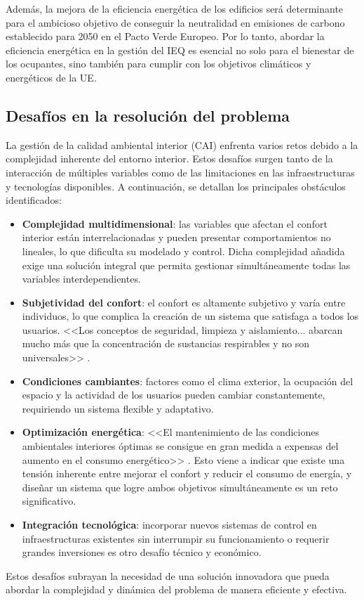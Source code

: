 Además, la mejora de la eficiencia energética de los edificios será determinante para el ambicioso objetivo de conseguir la neutralidad en emisiones de carbono establecido para 2050 en el Pacto Verde Europeo. Por lo tanto, abordar la eficiencia energética en la gestión del IEQ es esencial no solo para el bienestar de los ocupantes, sino también para cumplir con los objetivos climáticos y energéticos de la UE.

\subsection{Desafíos en la resolución del problema} 

La gestión de la calidad ambiental interior (CAI) enfrenta varios retos debido a la complejidad inherente del entorno interior. Estos desafíos surgen tanto de la interacción de múltiples variables como de las limitaciones en las infraestructuras y tecnologías disponibles. A continuación, se detallan los principales obstáculos identificados:

\begin{itemize}
	\item \textbf{Complejidad multidimensional}: las variables que afectan el confort interior están interrelacionadas y pueden presentar comportamientos no lineales, lo que dificulta su modelado y control. Dicha complejidad añadida exige una solución integral que permita gestionar simultáneamente todas las variables interdependientes.
	
	\item \textbf{Subjetividad del confort}: el confort es altamente subjetivo y varía entre individuos, lo que complica la creación de un sistema que satisfaga a todos los usuarios. <<Los conceptos de seguridad, limpieza y aislamiento... abarcan mucho más que la concentración de sustancias respirables y no son universales>> \parencite{vargas2005calidad}.
	
	\item \textbf{Condiciones cambiantes}: factores como el clima exterior, la ocupación del espacio y la actividad de los usuarios pueden cambiar constantemente, requiriendo un sistema flexible y adaptativo.
	
	\item \textbf{Optimización energética}: <<El mantenimiento de las condiciones ambientales interiores óptimas se consigue en gran medida a expensas del aumento en el consumo energético>> \parencite{vargas2005calidad}. Esto viene a indicar que existe una tensión inherente entre mejorar el confort y reducir el consumo de energía, y diseñar un sistema que logre ambos objetivos simultáneamente es un reto significativo.
	
	\item \textbf{Integración tecnológica}: incorporar nuevos sistemas de control en infraestructuras existentes sin interrumpir su funcionamiento o requerir grandes inversiones es otro desafío técnico y económico.
	
\end{itemize}

Estos desafíos subrayan la necesidad de una solución innovadora que pueda abordar la complejidad y dinámica del problema de manera eficiente y efectiva.




